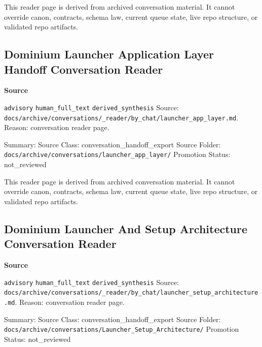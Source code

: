 \documentclass[9pt,a4paper,openany]{book}
\newcommand{\vonecallout}[3]{\par\medskip\noindent\begingroup\setlength{\fboxsep}{7pt}\colorbox{DomCalloutBg}{\parbox{0.94\linewidth}{\textbf{\textcolor{#1}{#2}}\par #3}}\endgroup\par\medskip}
\begin{document}
This reader page is derived from archived conversation material.\allowbreak{} It cannot override canon, contracts, schema law, current queue state, live repo structure, or validated repo artifacts.\allowbreak{}



\subsection{Dominium Launcher Application Layer Handoff Conversation Reader}

\vonecallout{DomSlate}{Source}{\texttt{advisory} \texttt{human\_\allowbreak{}full\_\allowbreak{}text} \texttt{derived\_\allowbreak{}synthesis} Source: \texttt{docs/\allowbreak{}archive/\allowbreak{}conversations/\allowbreak{}\_\allowbreak{}reader/\allowbreak{}by\_\allowbreak{}chat/\allowbreak{}launcher\_\allowbreak{}app\_\allowbreak{}layer.\allowbreak{}md}.\allowbreak{} Reason: conversation reader page.\allowbreak{}}

Summary: Source Class: conversation\_\allowbreak{}handoff\_\allowbreak{}export Source Folder: \texttt{docs/\allowbreak{}archive/\allowbreak{}conversations/\allowbreak{}launcher\_\allowbreak{}app\_\allowbreak{}layer/\allowbreak{}} Promotion Status: not\_\allowbreak{}reviewed


This reader page is derived from archived conversation material.\allowbreak{} It cannot override canon, contracts, schema law, current queue state, live repo structure, or validated repo artifacts.\allowbreak{}



\subsection{Dominium Launcher And Setup Architecture Conversation Reader}

\vonecallout{DomSlate}{Source}{\texttt{advisory} \texttt{human\_\allowbreak{}full\_\allowbreak{}text} \texttt{derived\_\allowbreak{}synthesis} Source: \texttt{docs/\allowbreak{}archive/\allowbreak{}conversations/\allowbreak{}\_\allowbreak{}reader/\allowbreak{}by\_\allowbreak{}chat/\allowbreak{}launcher\_\allowbreak{}setup\_\allowbreak{}architecture.\allowbreak{}md}.\allowbreak{} Reason: conversation reader page.\allowbreak{}}

Summary: Source Class: conversation\_\allowbreak{}handoff\_\allowbreak{}export Source Folder: \texttt{docs/\allowbreak{}archive/\allowbreak{}conversations/\allowbreak{}Launcher\_\allowbreak{}Setup\_\allowbreak{}Architecture/\allowbreak{}} Promotion Status: not\_\allowbreak{}reviewed
\end{document}
